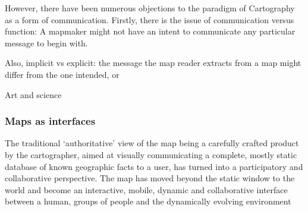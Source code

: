 However, there have been numerous objections to the paradigm of Cartography as a form of communication.
Firstly, there is the issue of communication versus function:
A mapmaker might not have an intent to communicate any particular message to begin with.

Also, implicit vs explicit:
the message the map reader extracts from a map might differ from the one intended, or


Art and science \parencite{mac2004, tyn1992}  %






\subsubsection{Maps as interfaces}

\parencite{kra2017}
The traditional ‘authoritative’ view of the map being a carefully crafted product
by the cartographer, aimed at visually communicating a complete, mostly static database
of known geographic facts to a user, has turned into a participatory and collaborative perspective.
The map has moved beyond the static window to the world and become an
interactive, mobile, dynamic and collaborative interface between a human, groups of
people and the dynamically evolving environment


\textcite{rot2013a, rot2013b}

